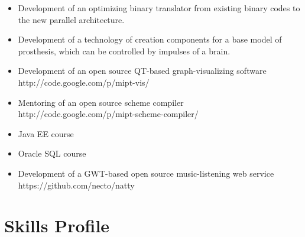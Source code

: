\documentclass[letterpaper]{resume}
\begin{document}
\begin{itemize}
	\item Development of an optimizing binary translator from existing binary codes to the new parallel architecture.
\end{itemize}
\begin{itemize}
  \item Development of a technology of creation components for a base model of prosthesis, which can be controlled by impulses of a brain.
\end{itemize}
\begin{itemize}
	\item Development of an open source QT-based graph-visualizing software http://code.google.com/p/mipt-vis/
        \item Mentoring of an open source scheme compiler http://code.google.com/p/mipt-scheme-compiler/
\end{itemize}
\begin{itemize}
	\item Java EE course
	\item Oracle SQL course
	\item Development of a GWT-based open source music-listening web service https://github.com/necto/natty 
\end{itemize}

\section{Skills Profile}
\end{document}

